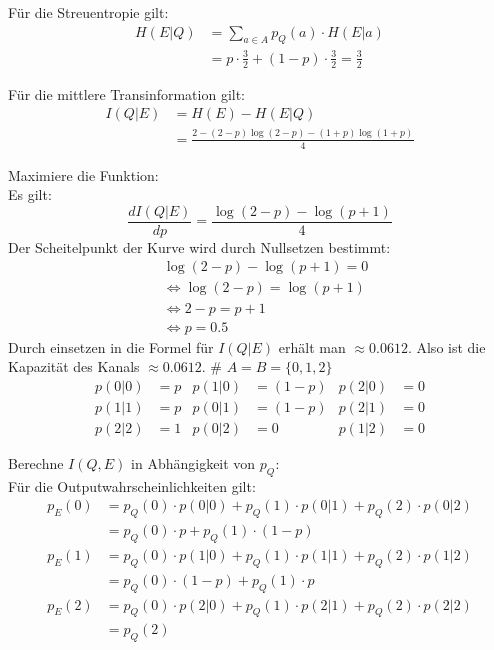 \begin{myList}
Für die Streuentropie gilt:
\begin{align*}
	H(E|Q) &= \sum\limits_{a \in A} p_Q(a) \cdot H(E|a) \\
	&= p \cdot \frac{3}{2} + (1-p) \cdot \frac{3}{2} = \frac{3}{2}
\end{align*}

Für die mittlere Transinformation gilt:
\begin{align*}
	I(Q|E) &= H(E) - H(E|Q)\\
	&= \frac{2 -(2-p)\log(2-p) - (1+p)\log(1+p)}{4}
\end{align*}

Maximiere die Funktion:\\
Es gilt:
\begin{equation*}
	\frac{dI(Q|E)}{dp} = \frac{\log(2-p)- \log(p+1)}{4}
\end{equation*}
Der Scheitelpunkt der Kurve wird durch Nullsetzen bestimmt:
\begin{align*}
	&\log(2-p) - \log(p+1) = 0 \\
	&\Leftrightarrow \log(2-p) = \log(p+1) \\
	&\Leftrightarrow 2-p = p+1 \\
	&\Leftrightarrow p = 0.5
\end{align*}
Durch einsetzen in die Formel für $I(Q|E)$ erhält man $\approx 0.0612$.
Also ist die Kapazität des Kanals $\approx 0.0612$.
#
$A = B = \lbrace 0,1,2 \rbrace$
\begin{align*}
	p(0|0) &= p & p(1|0) &= (1-p) & p(2|0) &= 0 \\
	p(1|1) &= p & p(0|1) &= (1-p) & p(2|1) &= 0 \\
	p(2|2) &= 1 & p(0|2) &= 0 & p(1|2) &= 0
\end{align*}

Berechne $I(Q,E)$ in Abhängigkeit von $p_Q$:\\
Für die Outputwahrscheinlichkeiten gilt:
\begin{align*}
	p_E(0) &= p_Q(0) \cdot p(0|0) + p_Q(1) \cdot p(0|1) + p_Q(2) \cdot p(0|2) \\
	&= p_Q(0) \cdot p + p_Q(1) \cdot (1-p) \\
	p_E(1) &= p_Q(0) \cdot p(1|0) + p_Q(1) \cdot p(1|1) + p_Q(2) \cdot p(1|2)\\
	&= p_Q(0) \cdot (1-p) + p_Q(1) \cdot p \\
	p_E(2) &= p_Q(0) \cdot p(2|0) + p_Q(1) \cdot p(2|1) + p_Q(2) \cdot p(2|2)\\
	&= p_Q(2)
\end{align*}


\end{myList}
